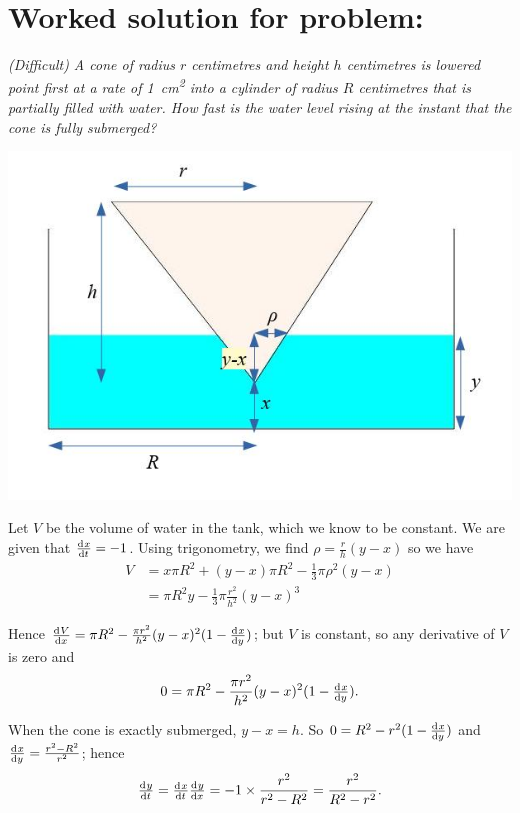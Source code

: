 \documentclass{amsart}
\theoremstyle{definition}
\begin{document}
\section*{Worked solution for problem:}
\textit{(Difficult) A cone of radius $ r $ centimetres and height $ h $ centimetres is lowered point first
            at a rate of \SI{1}{\centi\metre\squared} into a cylinder of radius $ R $ centimetres that is partially filled with
            water. How fast is the water level rising at the instant that the cone is fully submerged?}

\includegraphics[width=\textwidth]{coneintank}

Let $ V $ be the volume of water in the tank, which we know to be constant. We are given that $ \od{x}{t} = -1 $. Using trigonometry,
we find $ \rho = \frac{r}{h}(y - x) $ so we have
\begin{align*}
  V &= x\pi R^2 + (y - x) \pi R^2 - \frac{1}{3} \pi \rho^2 (y-x)\\
    &= \pi R^2 y - \frac{1}{3} \pi \frac{r^2}{h^2} (y-x)^3
\end{align*}

Hence $ \od{V}{x} = \pi R^2 - \frac{\pi r^2}{h^2} (y-x)^2 (1 - \od{x}{y}) $; but $ V $ is constant, so any derivative of $ V $ is zero and
\begin{displaymath}
  0 = \pi R^2 - \frac{\pi r^2}{h^2} (y-x)^2 (1 - \od{x}{y}).
\end{displaymath}

When the cone is exactly submerged, $ y - x = h $. So $ 0 = R^2 - r^2 (1 - \od{x}{y}) $ and $ \od{x}{y} = \frac{r^2 - R^2}{r^2} $; hence
\begin{displaymath}
  \od{y}{t} = \od{x}{t} \od{y}{x} = -1 \times \frac{r^2}{r^2 - R^2} = \frac{r^2}{R^2 - r^2}.
\end{displaymath}
\end{document}
